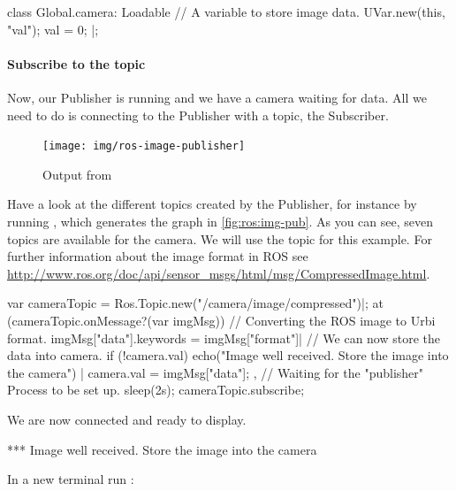 \begin{urbiunchecked}
class Global.camera: Loadable
{
  // A variable to store image data.
  UVar.new(this, "val");
  val = 0;
}|;
\end{urbiunchecked}


\paragraph{Subscribe to the topic}
Now, our Publisher is running and we have a camera waiting for data.  All we
need to do is connecting to the Publisher with a topic, the Subscriber.

\begin{figure}[htp]
  \centering
  \texttt{[image: img/ros-image-publisher]}
  \caption{Output from }
  \label{fig:ros:img-pub}
\end{figure}

Have a look at the different topics created by the Publisher, for instance
by running , which generates the graph in
\autoref{fig:ros:img-pub}.  As you can see, seven topics are available for
the camera. We will use the  topic for this
example.  For further information about the image format in ROS see
\url{http://www.ros.org/doc/api/sensor_msgs/html/msg/CompressedImage.html}.

\begin{urbiunchecked}
var cameraTopic = Ros.Topic.new("/camera/image/compressed")|;
at (cameraTopic.onMessage?(var imgMsg))
{
  // Converting the ROS image to Urbi format.
  imgMsg["data"].keywords = imgMsg["format"]|
  // We can now store the data into camera.
  if (!camera.val)
    echo("Image well received. Store the image into the camera") |
  camera.val = imgMsg["data"];
},
// Waiting for the "publisher" Process to be set up.
sleep(2s);
cameraTopic.subscribe;
\end{urbiunchecked}

We are now connected and ready to display.

\begin{urbiunchecked}
[00000003] *** Image well received. Store the image into the camera
\end{urbiunchecked}

In a new terminal run :


